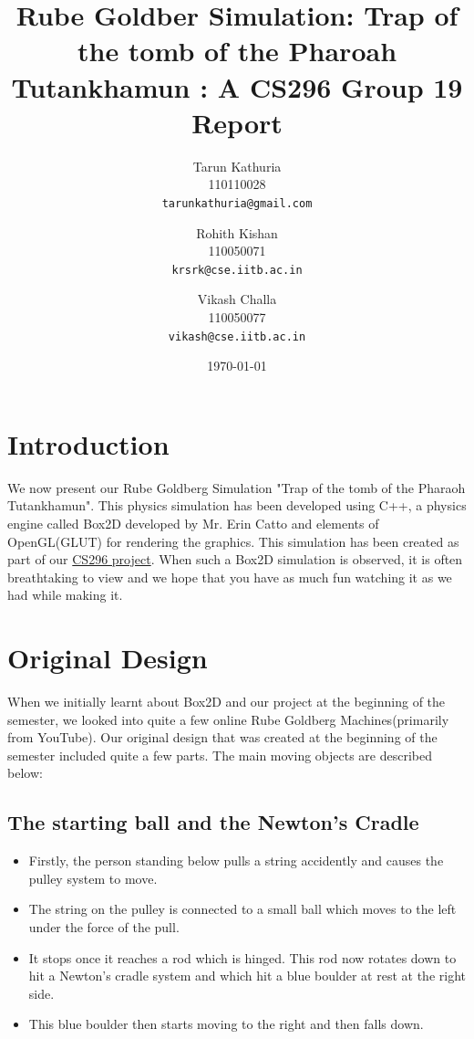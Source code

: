 \documentclass[11pt]{article}
\begin{document}
\title{Rube Goldber Simulation: Trap of the tomb of the Pharoah Tutankhamun : A CS296 Group 19 Report}
\author{Tarun Kathuria \\ 110110028 \\ \texttt{tarunkathuria@gmail.com} \and Rohith Kishan \\ 110050071 \\ \texttt{krsrk@cse.iitb.ac.in} \and Vikash Challa \\ 110050077 \\ \texttt{vikash@cse.iitb.ac.in}}
\date{\today}
\maketitle

\section{Introduction}

We now present our Rube Goldberg Simulation\cite{wikirgm} "Trap of the tomb of the Pharaoh Tutankhamun". 
This physics simulation has been developed using C++, a physics engine called Box2D developed by Mr. Erin Catto and elements of OpenGL(GLUT) for rendering the graphics. This simulation has been created as part of our \underline{CS296 project}. When such a Box2D simulation is observed, it is often breathtaking to view and we hope that you have as much fun watching it as we had while making it.

\section{Original Design}

When we initially learnt about Box2D and our project at the beginning of the semester, we looked into quite a few online Rube Goldberg Machines(primarily from YouTube\cite{rubegoldbergYouTube}). Our original design that was created at the beginning of the semester included quite a few parts. The main moving objects are described below:

\subsection{The starting ball and the Newton's Cradle}

\begin{itemize}
	\item Firstly, the person standing below pulls a string accidently and causes the pulley system to move. 
	\item The string on the pulley is connected to a small ball which moves to the left under the force of the pull. 
	\item It stops once it reaches a rod which is hinged. This rod now rotates down to hit a Newton's cradle system and which hit a blue boulder at rest at the right side. 
	\item This blue boulder then starts moving to the right and then falls down.
\end{itemize}
\end{document}
